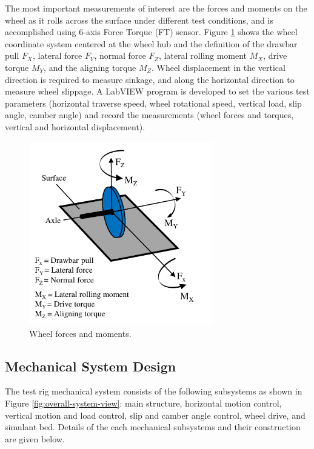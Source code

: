 \documentclass{article}
\begin{document}
The most important measurements of interest are the forces and moments on the wheel as it rolls across the surface under different test conditions, and is accomplished using 6-axis Force Torque (FT) sensor. Figure \ref{fig:wheel-forces-and-moments} shows the wheel coordinate system centered at the wheel hub and the definition of the drawbar pull $F_X$, lateral force $F_Y$, normal force $F_Z$, lateral rolling moment $M_X$, drive torque $M_Y$, and the aligning torque $M_Z$. Wheel displacement in the vertical direction is required to measure sinkage, and along the horizontal direction to measure wheel slippage. A LabVIEW program is developed to set the various test parameters (horizontal traverse speed, wheel rotational speed, vertical load, slip angle, camber angle) and record the measurements (wheel forces and torques, vertical and horizontal displacement).  

\begin{figure}[hbt!]
\centering
\includegraphics[width=3.15in]{general-images/wheel-forces-and-moments.pdf}
\caption{Wheel forces and moments.}
\label{fig:wheel-forces-and-moments}
\end{figure}


\subsection{Mechanical System Design}

The test rig mechanical system consists of the following subsystems as shown in Figure \ref{fig:overall-system-view}: main structure, horizontal motion control, vertical motion and load control, slip and camber angle control, wheel drive, and simulant bed. Details of the each mechanical subsystems and their construction are given below.
\end{document}
